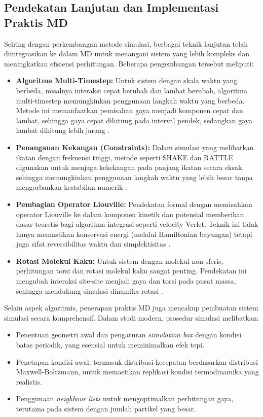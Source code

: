 \subsection{Pendekatan Lanjutan dan Implementasi Praktis MD}
Seiring dengan perkembangan metode simulasi, berbagai teknik lanjutan telah diintegrasikan ke dalam MD untuk menangani sistem yang lebih kompleks dan meningkatkan efisiensi perhitungan.
Beberapa pengembangan tersebut meliputi:
\begin{itemize}
    \item \textbf{Algoritma Multi-Timestep:} Untuk sistem dengan skala waktu yang berbeda, misalnya interaksi cepat berubah dan lambat berubah, algoritma multi-timestep memungkinkan penggunaan langkah waktu yang berbeda.
Metode ini memanfaatkan pemisahan gaya menjadi komponen cepat dan lambat, sehingga gaya cepat dihitung pada interval pendek, sedangkan gaya lambat dihitung lebih jarang \citep{Frenkel2001}.
    \item \textbf{Penanganan Kekangan (Constraints):} Dalam simulasi yang melibatkan ikatan dengan frekuensi tinggi, metode seperti SHAKE dan RATTLE digunakan untuk menjaga kekekangan pada panjang ikatan secara eksak, sehingga memungkinkan penggunaan langkah waktu yang lebih besar tanpa mengorbankan kestabilan numerik \citep{Frenkel2001}.
    \item \textbf{Pembagian Operator Liouville:} Pendekatan formal dengan memisahkan operator Liouville ke dalam komponen kinetik dan potensial memberikan dasar teoretis bagi algoritma integrasi seperti velocity Verlet.
Teknik ini tidak hanya memastikan konservasi energi (melalui Hamiltonian bayangan) tetapi juga sifat reversibilitas waktu dan simplektisitas \citep{Frenkel2001}.
    \item \textbf{Rotasi Molekul Kaku:} Untuk sistem dengan molekul non-sferis, perhitungan torsi dan rotasi molekul kaku sangat penting.
Pendekatan ini mengubah interaksi site-site menjadi gaya dan torsi pada pusat massa, sehingga mendukung simulasi dinamika rotasi \citep{Frenkel2001}.
\end{itemize}
Selain aspek algoritmis, penerapan praktis MD juga mencakup pembuatan sistem simulasi secara komprehensif.
Dalam studi modern, prosedur simulasi melibatkan:
\begin{itemize}
    \item Penentuan geometri awal dan pengaturan \emph{simulation box} dengan kondisi batas periodik, yang esensial untuk meminimalkan efek tepi.
    \item Penetapan kondisi awal, termasuk distribusi kecepatan berdasarkan distribusi Maxwell-Boltzmann, untuk memastikan replikasi kondisi termodinamika yang realistis.
    \item Penggunaan \emph{neighbour lists} untuk mengoptimalkan perhitungan gaya, terutama pada sistem dengan jumlah partikel yang besar.
\end{itemize}
